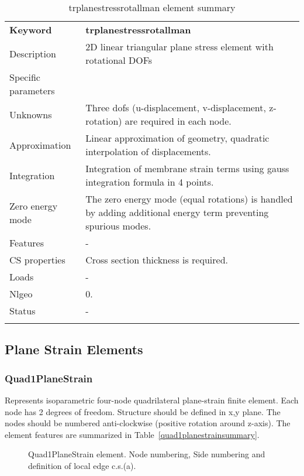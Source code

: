 \documentclass[a4paper]{article}
\newcommand{\templabel}{}%
\newcommand{\tempcaption}{}%
\newcounter{nelpar}
\newenvironment{elementsummary}[5]{%
  \gdef\tempcaption{#4}%
  \gdef\templabel{#5}%
  \setcounter{nelpar}{0}%
  \begin{center} %
    \begin{table}[!htb] %
      \begin{tabular}{|l|p{9cm}|}\hline %
        {\bf Keyword} & \bf{#1}\\ %
        {Description} & {#2}\\ %
        {Specific parameters} & {#3}\\ \hline %
}{
  \\ \hline %
      \end{tabular}%
      \caption{\tempcaption}%
      \label{\templabel}%
    \end{table}%
  \end{center}%
}
\newcommand{\elementDescription}[2]{{#1} & {#2}\\ }
\begin{document}
\begin{elementsummary}{trplanestressrotallman}{2D linear triangular plane stress element with rotational DOFs}{}{trplanestressrotallman element summary}{TrPlaneStressRotAllmansummary}
\elementDescription{Unknowns}{Three dofs (u-displacement, v-displacement, z-rotation) are required in each node.}
\elementDescription{Approximation}{Linear approximation of geometry, quadratic interpolation of displacements.}
\elementDescription{Integration}{Integration of membrane strain terms using gauss integration formula in 4 points.}
\elementDescription{Zero energy mode}{The zero energy mode (equal rotations) is handled by adding additional energy term preventing spurious modes.}

\elementDescription{Features}{-}
\elementDescription{CS properties}{Cross section thickness is required.}
\elementDescription{Loads}{-}
\elementDescription{Nlgeo}{0.}
\elementDescription{Status}{-}
\end{elementsummary}



\clearpage
\subsection{Plane Strain Elements}

\subsubsection{Quad1PlaneStrain}
Represents isoparametric four-node quadrilateral plane-strain
finite element. Each node has 2 degrees of freedom.
Structure should be defined in x,y plane. 
The nodes should be numbered anti-clockwise (positive rotation around
z-axis). The element features are summarized in Table~\ref{quad1planestrainsummary}.

\begin{figure}[htb]
 \centering
 \begin{makeimage}
  
 \end{makeimage}
 \caption{Quad1PlaneStrain element. Node numbering, Side numbering and
 definition of local edge c.s.(a).}
 \label{Quad1PlaneStrainfig}
\end{figure}
\end{document}

